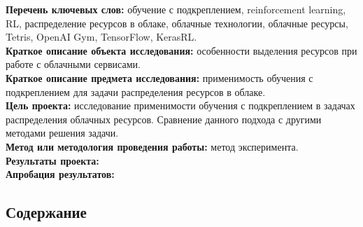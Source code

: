 \documentclass{article}
\begin{document}
\textbf{Перечень ключевых слов: }обучение с подкреплением, reinforcement learning, RL, распределение ресурсов в облаке, облачные технологии, облачные ресурсы, Tetris, OpenAI Gym, TensorFlow, KerasRL.\\
\textbf{Краткое описание объекта исследования:} особенности выделения ресурсов при работе с облачными сервисами.\\
\textbf{Краткое описание предмета исследования:} применимость обучения с подкреплением для задачи распределения ресурсов в облаке.\\
\textbf{Цель проекта:} исследование применимости обучения с подкреплением в задачах распределения облачных ресурсов. Сравнение данного подхода с другими методами решения задачи. \\
\textbf{Метод или методология проведения работы:} метод эксперимента.\\
\textbf{Результаты проекта:}\\
\textbf{Апробация результатов:}\\
\newpage
\begin{center}
\section {Содержание}
\tableofcontents
\end{center}
\newpage
\end{document}
